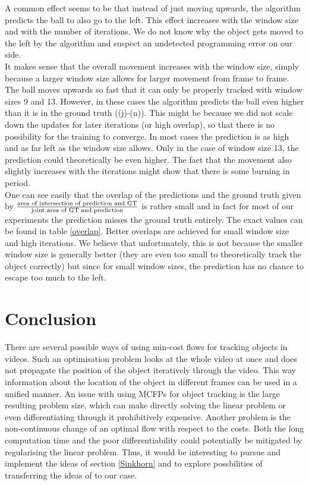 \documentclass{article}
\begin{document}
{A common effect seems to be that instead of just moving upwards, the algorithm predicts the ball to also go to the left. This effect increases with the window size and with the number of iterations. We do not know why the object gets moved to the left by the algorithm and suspect an undetected programming error on our side.\\
It makes sense that the overall movement increases with the window size, simply because a larger window size allows for larger movement from frame to frame. 
The ball moves upwards so fast that it can only be properly tracked with window sizes 9 and 13. However, in these cases the algorithm predicts the ball even higher than it is in the ground truth ((j)-(n)). This might be because we did not scale down the updates for later iterations (or high overlap), so that there is no possibility for the training to converge. In most cases the prediction is as high and as far left as the window size allows. Only in the case of window size 13, the prediction could theoretically be even higher. The fact that the movement also slightly increases with the iterations might show that there is some burning in period.\\
One can see easily that the overlap of the predictions and the ground truth given by $\frac{\textnormal{area of intersection of prediction and GT}}{\textnormal{joint area of GT and prediction}}$ is rather small and in fact for most of our experiments the prediction misses the ground truth entirely. The exact values can be found in table \ref{overlap}. Better overlaps are achieved for small window size and high iterations. We believe that unfortunately, this is not because the smaller window size is generally better (they are even too small to theoretically track the object correctly) but since for small window sizes, the prediction has no chance to escape too much to the left.

\section{Conclusion}
There are several possible ways of using min-cost flows for tracking objects in videos. Such an optimisation problem looks at the whole video at once and does not propagate the position of the object iteratively through the video. This way information about the location of the object in different frames can be used in a unified manner. An issue with using MCFPs for object tracking is the large resulting problem size, which can make directly solving the linear problem or even differentiating through it prohibitively expensive. Another problem is the non-continuous change of an optimal flow with respect to the costs. Both the long computation time and the poor differentiability could potentially be mitigated by regularising the linear problem. Thus, it would be interesting to pursue and implement the ideas of section \ref{Sinkhorn} and to explore possbilities of transferring the ideas of \cite{sch17} to our case.

}
\end{document}
